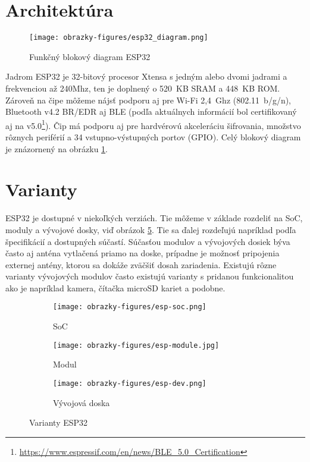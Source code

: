 \section{Architektúra}

\begin{figure}[ht]
    \centering
    \texttt{[image: obrazky-figures/esp32\_diagram.png]}
    \caption{Funkčný blokový diagram ESP32\cite{esp-datasheet}}
    \label{fig:esp_diagram}
\end{figure}

Jadrom ESP32 je 32-bitový procesor Xtensa s jedným alebo dvomi jadrami a frekvenciou až 240Mhz, ten je doplnený o 520~KB SRAM a 448~KB ROM. Zároveň na čipe môžeme nájsť podporu aj pre Wi-Fi 2,4~Ghz (802.11~b/g/n), Bluetooth v4.2 BR/EDR aj BLE (podľa aktuálnych informácií bol certifikovaný aj na v5.0\footnote{\url{https://www.espressif.com/en/news/BLE_5.0_Certification}}).
Čip má podporu aj pre hardvérovú akceleráciu šifrovania, množstvo rôznych periférií a 34 vstupno-výstupných portov (GPIO). Celý blokový diagram je znázornený na obrázku \ref{fig:esp_diagram}.\cite{esp-datasheet}


\section{Varianty}

ESP32 je dostupné v niekoľkých verziách. Tie môžeme v základe rozdeliť na SoC, moduly a vývojové dosky, viď obrázok \ref{fig:esp32_varianty}. Tie sa ďalej rozdeľujú napríklad podľa špecifikácií a dostupných súčastí. Súčasťou  modulov a vývojových dosiek býva často aj anténa vytlačená priamo na doske, prípadne je možnosť pripojenia externej antény, ktorou sa dokáže zväčšiť dosah zariadenia. Existujú rôzne varianty vývojových modulov často existujú varianty s pridanou funkcionalitou ako je napríklad kamera, čítačka microSD kariet a podobne.

\begin{figure}[ht]
    \centering
    \begin{subfigure}{.3\textwidth}
      \centering
      \texttt{[image: obrazky-figures/esp-soc.png]}  
      \caption{SoC}
      \label{fig:esp32_soc}
    \end{subfigure}
    \begin{subfigure}{.3\textwidth}
      \centering
      \texttt{[image: obrazky-figures/esp-module.jpg]}  
      \caption{Modul}
      \label{fig:esp32_module}
    \end{subfigure}
    \begin{subfigure}{.3\textwidth}
      \centering
      \texttt{[image: obrazky-figures/esp-dev.png]}
      \caption{Vývojová doska}
      \label{fig:esp32_dev}
    \end{subfigure}
    \caption{Varianty ESP32}
    \label{fig:esp32_varianty}
\end{figure}


